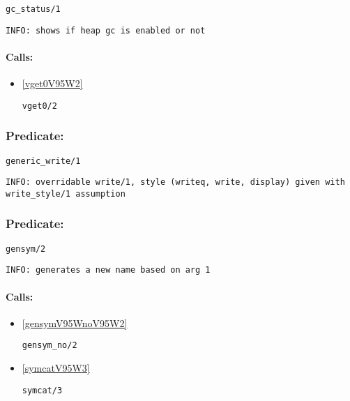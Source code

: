 \begin{verbatim}
gc_status/1
\end{verbatim}

{\small \begin{verbatim}
INFO: shows if heap gc is enabled or not

\end{verbatim}}
\paragraph{Calls:} 
\begin{itemize}
\item \ref{vget0V95W2} 
\begin{verbatim}
vget0/2
\end{verbatim}

\end{itemize}

\subsubsection{Predicate:} \label{genericV95WwriteV95W1}

\begin{verbatim}
generic_write/1
\end{verbatim}

{\small \begin{verbatim}
INFO: overridable write/1, style (writeq, write, display) given with write_style/1 assumption

\end{verbatim}}

\subsubsection{Predicate:} \label{gensymV95W2}

\begin{verbatim}
gensym/2
\end{verbatim}

{\small \begin{verbatim}
INFO: generates a new name based on arg 1

\end{verbatim}}
\paragraph{Calls:} 
\begin{itemize}
\item \ref{gensymV95WnoV95W2} 
\begin{verbatim}
gensym_no/2
\end{verbatim}

\item \ref{symcatV95W3} 
\begin{verbatim}
symcat/3
\end{verbatim}

\end{itemize}
